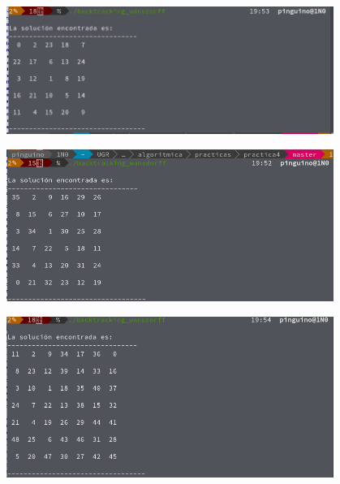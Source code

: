 \documentclass[a4paper, 11pt]{article}
\begin{document}
\includegraphics[width=0.8\textwidth]{00.png}

\includegraphics[width=0.8\textwidth]{01.png}								

\includegraphics[width=0.8\textwidth]{02.png}

	
\end{document}
